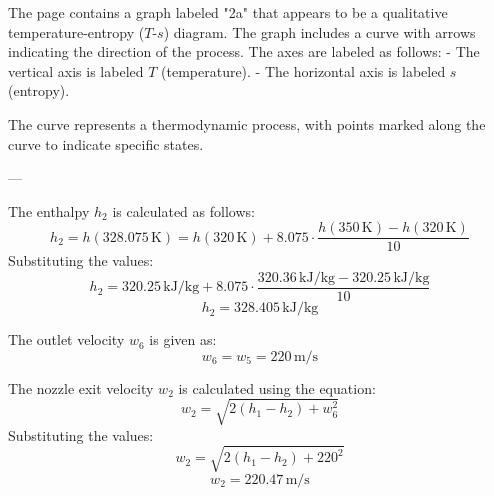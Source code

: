 The page contains a graph labeled "2a" that appears to be a qualitative temperature-entropy (\( T \)-\( s \)) diagram. The graph includes a curve with arrows indicating the direction of the process. The axes are labeled as follows:  
- The vertical axis is labeled \( T \) (temperature).  
- The horizontal axis is labeled \( s \) (entropy).  

The curve represents a thermodynamic process, with points marked along the curve to indicate specific states.  

---

The enthalpy \( h_2 \) is calculated as follows:  
\[
h_2 = h(328.075 \, \text{K}) = h(320 \, \text{K}) + 8.075 \cdot \frac{h(350 \, \text{K}) - h(320 \, \text{K})}{10}
\]  
Substituting the values:  
\[
h_2 = 320.25 \, \text{kJ/kg} + 8.075 \cdot \frac{320.36 \, \text{kJ/kg} - 320.25 \, \text{kJ/kg}}{10}
\]  
\[
h_2 = 328.405 \, \text{kJ/kg}
\]  

The outlet velocity \( w_6 \) is given as:  
\[
w_6 = w_5 = 220 \, \text{m/s}
\]  

The nozzle exit velocity \( w_2 \) is calculated using the equation:  
\[
w_2 = \sqrt{2(h_1 - h_2) + w_6^2}
\]  
Substituting the values:  
\[
w_2 = \sqrt{2(h_1 - h_2) + 220^2}
\]  
\[
w_2 = 220.47 \, \text{m/s}
\]